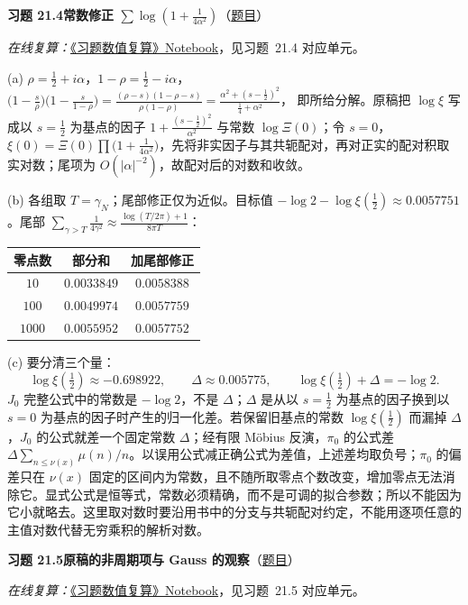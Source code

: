 \documentclass[11pt,a4paper]{article}
\newcommand{\Sol}[2]{%
  \par\addvspace{1.2em}\noindent
  \hypertarget{s:#1}{}\textbf{习题 #1\quad #2}\hfill{\small（\hyperlink{q:#1}{题目}）}\par
  \nopagebreak\smallskip}
\begin{document}
\Sol{21.4}{常数修正 $\sum\log(1+\frac1{4\alpha^2})$}
\emph{在线复算：}\href{https://colab.research.google.com/github/lichengtong123/lichengtong-RH/blob/main/\%E4\%B9\%A0\%E9\%A2\%98\%E4\%B8\%8E\%E8\%A7\%A3\%E7\%AD\%94/\%E4\%B9\%A0\%E9\%A2\%98\%E6\%95\%B0\%E5\%80\%BC\%E5\%A4\%8D\%E7\%AE\%97.ipynb}{《习题数值复算》Notebook}，见习题~21.4 对应单元。

(a) $\rho=\frac12+i\alpha$，$1-\rho=\frac12-i\alpha$，
$\bigl(1-\frac s\rho\bigr)\bigl(1-\frac s{1-\rho}\bigr)=\frac{(\rho-s)(1-\rho-s)}{\rho(1-\rho)}=\frac{\alpha^2+(s-\frac12)^2}{\frac14+\alpha^2}$，
即所给分解。原稿把 $\log\xi$ 写成以 $s=\frac12$ 为基点的因子 $1+\frac{(s-\frac12)^2}{\alpha^2}$ 与常数 $\log\Xi(0)$；令 $s=0$，$\xi(0)=\Xi(0)\prod\bigl(1+\frac1{4\alpha^2}\bigr)$，先将非实因子与其共轭配对，再对正实的配对积取实对数；尾项为 $O(|\alpha|^{-2})$，故配对后的对数和收敛。

(b) 各组取 $T=\gamma_N$；尾部修正仅为近似。目标值 $-\log2-\log\xi(\frac12)\approx0.0057751$。尾部 $\sum_{\gamma>T}\frac1{4\gamma^2}\approx\frac{\log(T/2\pi)+1}{8\pi T}$：
\begin{center}
\small
\begin{tabular}{@{}ccc@{}}
\toprule
零点数 & 部分和 & 加尾部修正 \\
\midrule
$10$ & $0.0033849$ & $0.0058388$ \\
$100$ & $0.0049974$ & $0.0057759$ \\
$1000$ & $0.0055952$ & $0.0057752$ \\
\bottomrule
\end{tabular}
\end{center}

(c) 要分清三个量：
\[
  \log\xi(\tfrac12)\approx-0.698922,\qquad \Delta\approx0.005775,\qquad \log\xi(\tfrac12)+\Delta=-\log2 .
\]
$J_0$ 完整公式中的常数是 $-\log2$，不是 $\Delta$；$\Delta$ 是从以 $s=\frac12$ 为基点的因子换到以 $s=0$ 为基点的因子时产生的归一化差。若保留旧基点的常数 $\log\xi(\frac12)$ 而漏掉 $\Delta$，$J_0$ 的公式就差一个固定常数 $\Delta$；经有限 Möbius 反演，$\pi_0$ 的公式差 $\Delta\sum_{n\le\nu(x)}\mu(n)/n$。以误用公式减正确公式为差值，上述差均取负号；$\pi_0$ 的偏差只在 $\nu(x)$ 固定的区间内为常数，且不随所取零点个数改变，增加零点无法消除它。显式公式是恒等式，常数必须精确，而不是可调的拟合参数；所以不能因为它小就略去。这里取对数时要沿用书中的分支与共轭配对约定，不能用逐项任意的主值对数代替无穷乘积的解析对数。

\Sol{21.5}{原稿的非周期项与 Gauss 的观察}
\emph{在线复算：}\href{https://colab.research.google.com/github/lichengtong123/lichengtong-RH/blob/main/\%E4\%B9\%A0\%E9\%A2\%98\%E4\%B8\%8E\%E8\%A7\%A3\%E7\%AD\%94/\%E4\%B9\%A0\%E9\%A2\%98\%E6\%95\%B0\%E5\%80\%BC\%E5\%A4\%8D\%E7\%AE\%97.ipynb}{《习题数值复算》Notebook}，见习题~21.5 对应单元。
\end{document}
